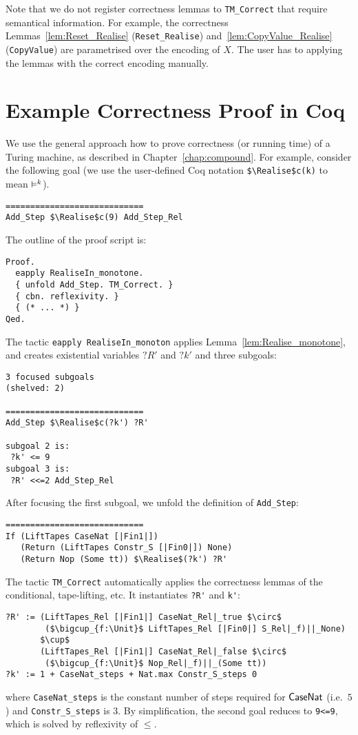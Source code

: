 Note that we do not register correctness lemmas to \lstinline!TM_Correct! that require semantical information.  For example, the correctness
Lemmas~\ref{lem:Reset_Realise} (\lstinline!Reset_Realise!) and~\ref{lem:CopyValue_Realise} (\lstinline!CopyValue!) are parametrised over the encoding
of $X$.  The user has to applying the lemmas with the correct encoding manually.


\section*{Example Correctness Proof in Coq}
\label{sec:coq-correctness}

We use the general approach how to prove correctness (or running time) of a Turing machine, as described in Chapter~\ref{chap:compound}.  For example,
consider the following goal (we use the user-defined Coq notation \lstinline!$\Realise$c(k)! to mean $\mathrel{\vDash^{k}}$).
\begin{lstlisting}
============================
Add_Step $\Realise$c(9) Add_Step_Rel
\end{lstlisting}
The outline of the proof script is:
\begin{lstlisting}
Proof.
  eapply RealiseIn_monotone.
  { unfold Add_Step. TM_Correct. }
  { cbn. reflexivity. }
  { (* ... *) }
Qed.
\end{lstlisting}

The tactic \lstinline!eapply RealiseIn_monoton! applies Lemma~\ref{lem:Realise_monotone}, and creates existential variables $?R'$ and $?k'$ and three
subgoals:
\begin{lstlisting}
3 focused subgoals
(shelved: 2)
  
============================
Add_Step $\Realise$c(?k') ?R'

subgoal 2 is:
 ?k' <= 9
subgoal 3 is:
 ?R' <<=2 Add_Step_Rel
\end{lstlisting}

After focusing the first subgoal, we unfold the definition of \lstinline!Add_Step!:
\begin{lstlisting}
============================
If (LiftTapes CaseNat [|Fin1|])
   (Return (LiftTapes Constr_S [|Fin0|]) None)
   (Return Nop (Some tt)) $\Realise$(?k') ?R'
\end{lstlisting}

The tactic \lstinline!TM_Correct! automatically applies the correctness lemmas of the conditional, tape-lifting, etc.  It instantiates
\lstinline!?R'! and \lstinline!k'!:
\begin{lstlisting}
?R' := (LiftTapes_Rel [|Fin1|] CaseNat_Rel|_true $\circ$
        ($\bigcup_{f:\Unit}$ LiftTapes_Rel [|Fin0|] S_Rel|_f)||_None)
       $\cup$
       (LiftTapes_Rel [|Fin1|] CaseNat_Rel|_false $\circ$
        ($\bigcup_{f:\Unit}$ Nop_Rel|_f)||_(Some tt))
?k' := 1 + CaseNat_steps + Nat.max Constr_S_steps 0
\end{lstlisting}
where \lstinline!CaseNat_steps! is the constant number of steps required for $\mathsf{CaseNat}$ (i.e.\ $5$) and \lstinline!Constr_S_steps! is $3$.  By
simplification, the second goal reduces to \lstinline!9<=9!, which is solved by reflexivity of $\leq$.

